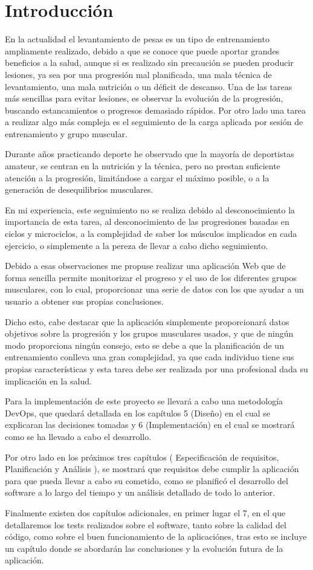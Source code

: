 \chapter{Introducción}

En la actualidad el levantamiento de pesas es un tipo de entrenamiento ampliamente realizado, debido a que se conoce que puede aportar grandes beneficios a la salud, aunque si es realizado sin precaución se pueden producir lesiones, ya sea por una progresión mal planificada, una mala técnica de levantamiento, una mala nutrición o un déficit de descanso. Una de las tareas más sencillas para evitar lesiones, es observar la evolución de la progresión, buscando estancamientos o progresos demasiado rápidos. Por otro lado una tarea a realizar algo más compleja es el seguimiento de la carga aplicada por sesión de entrenamiento y grupo muscular.

Durante años practicando deporte he observado que la mayoría de deportistas amateur, se centran en la nutrición y la técnica, pero no prestan suficiente atención a la progresión, limitándose a cargar el máximo posible, o a la generación de desequilibrios musculares. 

En mi experiencia, este seguimiento no se realiza debido al desconocimiento la importancia de esta tarea, al desconocimiento de las progresiones basadas en ciclos y microciclos, a la complejidad de saber los músculos implicados en cada ejercicio, o simplemente a la pereza de llevar a cabo dicho seguimiento.

Debido a esas observaciones me propuse realizar una aplicación Web que de forma sencilla permite monitorizar el progreso y el uso de los diferentes grupos musculares, con lo cual, proporcionar una serie de datos con los que ayudar a un usuario a obtener sus propias conclusiones.

Dicho esto, cabe destacar que la aplicación simplemente proporcionará datos objetivos sobre la progresión y los grupos musculares usados, y que de ningún modo proporciona ningún consejo, esto se debe a que la planificación de un entrenamiento conlleva una gran complejidad, ya que cada individuo tiene sus propias características y esta tarea debe ser realizada por una profesional dada su implicación en la salud.

Para la implementación de este proyecto se llevará a cabo una metodología DevOps, que quedará detallada en los capítulos 5 (Diseño) en el cual se explicaran las decisiones tomadas y 6 (Implementación) en el cual se mostrará como se ha llevado a cabo el desarrollo.

Por otro lado en los próximos tres capítulos ( Especificación de requisitos, Planificación y Análisis ), se mostrará que requisitos debe cumplir la aplicación para que pueda llevar a cabo su cometido, como se planificó el desarrollo del software a lo largo del tiempo y un análisis detallado de todo lo anterior.

Finalmente existen dos capítulos adicionales, en primer lugar el 7, en el que detallaremos los tests realizados sobre el software, tanto sobre la calidad del código, como sobre el buen funcionamiento de la aplicaciónes, tras esto se incluye un capítulo donde se abordarán las conclusiones y la evolución futura de la aplicación.


